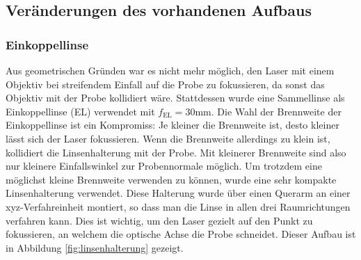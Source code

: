 \documentclass[a4paper, titlepage,  ngerman, fullpage]{book}
\begin{document}
	\subsection{Veränderungen des vorhandenen Aufbaus}
	\label{sec:OpticalChanges}
	\subsubsection{Einkoppellinse}
	Aus geometrischen Gründen war es nicht mehr möglich, den Laser mit einem Objektiv bei streifendem Einfall auf die Probe zu fokussieren, da sonst das Objektiv mit der Probe kollidiert wäre. Stattdessen wurde eine Sammellinse als Einkoppellinse (EL) verwendet mit $f_{\mathrm{EL}}= 30\mathrm{mm}$. Die Wahl der Brennweite der Einkoppellinse ist ein Kompromiss: Je kleiner die Brennweite ist, desto kleiner lässt sich der Laser fokussieren. Wenn die Brennweite allerdings zu klein ist, kollidiert die Linsenhalterung mit der Probe. Mit kleinerer Brennweite sind also nur kleinere Einfallswinkel zur Probennormale möglich. Um trotzdem eine möglichst kleine Brennweite verwenden zu können, wurde eine sehr kompakte Linsenhalterung verwendet. Diese Halterung wurde über einen Querarm an einer xyz-Verfahreinheit montiert, so dass man die Linse in allen drei Raumrichtungen verfahren kann. Dies ist wichtig, um den Laser gezielt auf den Punkt zu fokussieren, an welchem die optische Achse die Probe schneidet. Dieser Aufbau ist in Abbildung \ref{fig:linsenhalterung} gezeigt.
\end{document}
